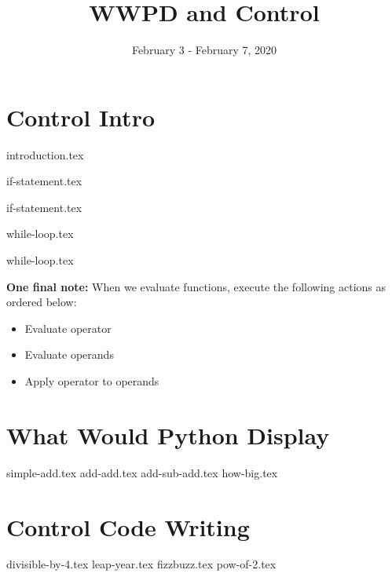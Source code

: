\documentclass{exam}
\title{WWPD and Control}
\date{February 3 - February 7, 2020}
\begin{document}
\maketitle
\section{Control Intro}
{introduction.tex}


{if-statement.tex}

{if-statement.tex}

{while-loop.tex}

{while-loop.tex}

\vspace{5}
\textbf{One final note: } When we evaluate functions, execute the following actions as ordered below:
\begin{itemize}
  \item Evaluate operator
  \item Evaluate operands 
  \item Apply operator to operands
\end{itemize}


\section{What Would Python Display}
\begin{questions}
{simple-add.tex}
{add-add.tex}
{add-sub-add.tex}
{how-big.tex}

\end{questions}
\newpage
\section{Control Code Writing}
\begin{questions}
{divisible-by-4.tex}
{leap-year.tex}
{fizzbuzz.tex}
{pow-of-2.tex}
\end{questions}
\end{document}
